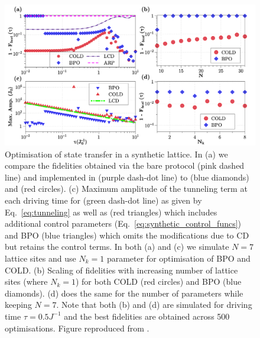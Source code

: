 \begin{figure}[t]
    \centering
    \includegraphics[width=\linewidth]{images/synthetic_lattice.png} \caption[COLD plots for ARP transport in a synthetic lattice]{Optimisation of state transfer in a synthetic lattice.  In (a) we compare the fidelities obtained via the bare  protocol (pink dashed line) and   implemented in \cite{meier_counterdiabatic_2020} (purple dash-dot line) to  (blue diamonds) and  (red circles). (c) Maximum amplitude of the tunneling term at each driving time for  (green dash-dot line) as given by Eq.~\eqref{eq:tunneling} as well as  (red triangles) which includes additional control parameters (Eq.~\eqref{eq:synthetic_control_funcs}) and BPO (blue triangles) which omits the modifications due to CD but retains the control terms. In both (a) and (c) we simulate $N = 7$ lattice sites and use $N_k = 1$ parameter for optimisation of BPO and COLD.  (b) Scaling of fidelities with increasing number of lattice sites (where $N_k = 1$) for both COLD (red circles) and BPO (blue diamonds). (d) does the same for the number of parameters while keeping $N=7$.  Note that both (b) and (d) are simulated for driving time $\tau = 0.5 J^{-1}$ and the best fidelities are obtained across 500 optimisations. Figure reproduced from \cite{cepaite_cold_2023}.}\label{fig:Synthetic}
\end{figure}

